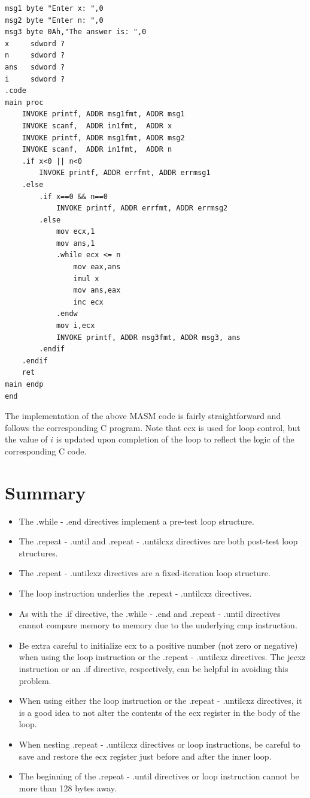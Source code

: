 \documentclass[10pt]{book}
\begin{document}
\begin{verbatim}
msg1 byte "Enter x: ",0
msg2 byte "Enter n: ",0
msg3 byte 0Ah,"The answer is: ",0
x     sdword ?
n     sdword ?
ans   sdword ?
i     sdword ?
.code
main proc
    INVOKE printf, ADDR msg1fmt, ADDR msg1
    INVOKE scanf,  ADDR in1fmt,  ADDR x
    INVOKE printf, ADDR msg1fmt, ADDR msg2
    INVOKE scanf,  ADDR in1fmt,  ADDR n
    .if x<0 || n<0
        INVOKE printf, ADDR errfmt, ADDR errmsg1
    .else
        .if x==0 && n==0
            INVOKE printf, ADDR errfmt, ADDR errmsg2
        .else
            mov ecx,1
            mov ans,1
            .while ecx <= n
                mov eax,ans
                imul x
                mov ans,eax
                inc ecx
            .endw
            mov i,ecx
            INVOKE printf, ADDR msg3fmt, ADDR msg3, ans
        .endif
    .endif
    ret
main endp
end
\end{verbatim}

The implementation of the above MASM code is fairly straightforward and follows the corresponding C program. Note that ecx is used for loop control, but the value of $i$ is updated upon completion of the loop to reflect the logic of the corresponding C code.

\section{Summary}
\begin{itemize}
  \item The .while - .end directives implement a pre-test loop structure.
  \item The .repeat - .until and .repeat - .untilcxz directives are both post-test loop structures.
  \item The .repeat - .untilcxz directives are a fixed-iteration loop structure.
  \item The loop instruction underlies the .repeat - .untilcxz directives.
  \item As with the .if directive, the .while - .end and .repeat - .until directives cannot compare memory to memory due to the underlying cmp instruction.
  \item Be extra careful to initialize ecx to a positive number (not zero or negative) when using the loop instruction or the .repeat - .untilcxz directives. The jecxz instruction or an .if directive, respectively, can be helpful in avoiding this problem.
  \item When using either the loop instruction or the .repeat - .untilcxz directives, it is a good idea to not alter the contents of the ecx register in the body of the loop.
  \item When nesting .repeat - .untilcxz directives or loop instructions, be careful to save and restore the ecx register just before and after the inner loop.
  \item The beginning of the .repeat - .until directives or loop instruction cannot be more than 128 bytes away.
\end{itemize}
\end{document}
